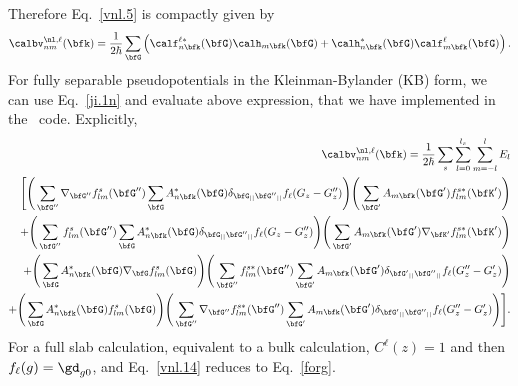 Therefore Eq.~\eqref{vnl.5} is compactly given by
\begin{align}\label{vnl.13}
\calbv^{\nl,\ell}_{nm}(\bfk)=\frac{1}{2 \hbar}
\sum_{\bfG}
\left(
\calf^{\ell*}_{n\bfk}(\bfG) 
\calh_{m\bfk}(\bfG) 
+
\calh^*_{n\bfk}(\bfG) 
\calf^\ell_{m\bfk}(\bfG) 
\right)
.
\end{align} 
For fully  separable pseudopotentials in the 
Kleinman-Bylander (KB) form,\cite{mottaCMS10,kleinman_efficacious_1982,adolphPRB96}
we can use Eq.~\eqref{ji.1n} and evaluate above expression, that we have
implemented in 
the \depe~code.\cite{francesco}
Explicitly,
\begin{eqnarray}\label{vnl.14}
\calbv^{\nl,\ell}_{nm}(\bfk)=\frac{1}{2 \hbar}
\sum_s\sum_{l=0}^{l_s}\sum_{m=-l}^{l}E_l \nonumber\\
\Bigg[ \Bigg(\sum_{{\bfG''}}
\nabla_{{\bfG''}}f_{lm}^s({\bfG''})
\sum_{\bfG}A^*_{n{\bfk}}(\bfG)\delta_{\bfG_{||}{\bfG''}_{||}}
f_\ell(G_z-G''_z) \Bigg)  
\Bigg( \sum_{{\bfG'}}A_{m{\bfk}}({\bfG'})f_{lm}^{s*}({\bfK'}) \Bigg) \nonumber\\
%
+ \Bigg(\sum_{{\bfG''}}
f_{lm}^s({\bfG''})\sum_{\bfG}A^*_{n{\bfk}}(\bfG)\delta_{\bfG_{||}{\bfG''}_{||}}
f_\ell(G_z-G''_z) \Bigg)  
\Bigg( \sum_{{\bfG'}}A_{m{\bfk}}({\bfG'})\nabla_{{\bfK'}}f_{lm}^{s*}({\bfK'}) \Bigg)  \nonumber\\
+
\Bigg(\sum_{\bfG}A^*_{n{\bfk}}(\bfG)\nabla_{\bfG}f_{lm}^s(\bfG)\Bigg)\Bigg(
\sum_{{\bfG''}}
f_{lm}^{s*}({\bfG''})\sum_{{\bfG'}}A_{m{\bfk}}({\bfG'})\delta_{{\bfG'}_{||}{\bfG''}_{||}}
f_\ell(G''_z-G'_z) \Bigg) \nonumber\\ 
+
\Bigg(\sum_{\bfG}A^*_{n{\bfk}}(\bfG)f_{lm}^s(\bfG)
\Bigg) \Bigg(
\sum_{{\bfG''}}\nabla_{{\bfG''}}f_{lm}^{s*}({\bfG''})
\sum_{{\bfG'}}A_{m{\bfk}}({\bfG'})\delta_{{\bfG'}_{||}{\bfG''}_{||}}
f_\ell(G''_z-G'_z) \Bigg) \Bigg].\nonumber\\ 
\end{eqnarray} 
For a full slab calculation, equivalent to a bulk calculation,
$C^\ell(z)=1$ and then 
$f_\ell(g) =\gd_{g0}$, and Eq.~\eqref{vnl.14}
reduces to 
Eq.~\eqref{forg}. 

